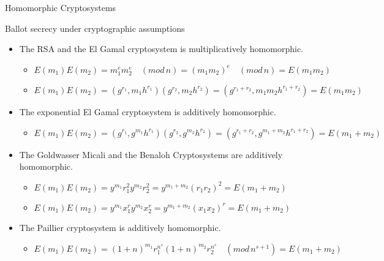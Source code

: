 \documentclass{beamer}
\newcommand{\md}[1]{\quad (mod \, {#1})}
\begin{document}
\begin{frame}{Homomorphic Cryptosystems}
\begin{block}{}
Ballot secrecy under cryptographic assumptions
\end{block}
\begin{itemize}
\item The RSA and the El Gamal cryptosystem is multiplicatively homomorphic.
	\begin{itemize}
		\item $ E(m_1)E(m_2) = m_{1}^{e} m_2^e \md{n} = (m_1 m_2)^e \md{n} = E(m_1 m_2) $
		\item $ E(m_1)E(m_2) = (g^{r_1},m_1 h^{r_1}) (g^{r_2},m_2 h^{r_2}) =  (g^{r_1+r_2}, m_1 m_2 h^{r_1+r_2}) = E(m_1 m_2)$
	\end{itemize}
\item The exponential El Gamal cryptosystem is additively homomorphic.
	\begin{itemize}
		\item $ E(m_1)E(m_2) = (g^{r_1},g^{m_1} h^{r_1}) (g^{r_2},g^{m_2} h^{r_2}) =  (g^{r_1+r_2}, g^{m_1 + m_2} h^{r_1+r_2}) = E(m_1 + m_2)$
	\end{itemize}
\item The Goldwasser Micali and the Benaloh Cryptosystems are additively homomorphic.
	\begin{itemize}
		\item $ E(m_1)E(m_2) =  y^{m_1} r_1^{2} y^{m_2} r_2^{2} = y^{m_1+m_2} (r_1r_2)^2 = E(m_1+m_2)$
		\item $ E(m_1)E(m_2) =  y^{m_1} x_1^{r} y^{m_2} x_2^{r} = y^{m_1+m_2} (x_1x_2)^r = E(m_1+m_2)$
	\end{itemize}
\item The Paillier cryptosystem is additively homomorphic.
	\begin{itemize}
		\item $ E(m_1)E(m_2) =  (1+n)^{m_1} r_1^{n^s} (1+n)^{m_2} r_2^{n^s} \md{n^{s+1}}= E(m_1 + m_2)$
	\end{itemize}
\end{itemize}
\end{frame}
\end{document}

